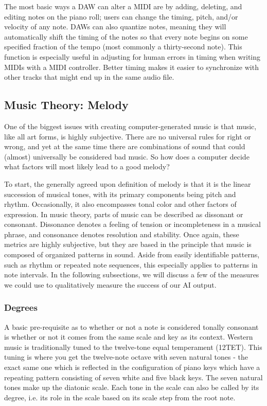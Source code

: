 The most basic ways a DAW can alter a MIDI are by adding, deleting, and editing notes on
the piano roll; users can change the timing, pitch, and/or velocity of any note. DAWs can
also quantize notes, meaning they will automatically shift the timing of the notes so that
every note begins on some specified fraction of the tempo (most commonly a thirty-second
note). This function is especially useful in adjusting for human errors in timing when
writing MIDIs with a MIDI controller. Better timing makes it easier to synchronize with
other tracks that might end up in the same audio file.

\subsection{Music Theory: Melody}

One of the biggest issues with creating computer-generated music is that music, like all art
forms, is highly subjective. There are no universal rules for right or wrong, and yet at the
same time there are combinations of sound that could (almost) universally be considered bad music.
So how does a computer decide what factors will most likely lead to a good melody?

To start, the generally agreed upon definition of melody is that it is the linear succession
of musical tones, with its primary components being pitch and rhythm. Occasionally, it also
encompasses tonal color and other factors of expression.\autocite{melody} In music theory, parts
of music can be described as dissonant or consonant. Dissonance denotes a feeling of tension or
incompleteness in a musical phrase, and consonance denotes resolution and stability. Once again,
these metrics are highly subjective, but they are based in the principle that music is composed
of organized patterns in sound.\autocite{musiciansArithmetic} Aside from easily identifiable
patterns, such as rhythm or repeated note sequences, this especially applies to patterns in note
intervals. In the following subsections, we will discuss a few of the measures we could use to
qualitatively measure the success of our AI output.

\subsubsection{Degrees}

A basic pre-requisite as to whether or not a note is considered tonally consonant is whether or
not it comes from the same scale and key as its context. Western music is traditionally tuned to
the twelve-tone equal temperament (12TET). This tuning is where you get the twelve-note octave
with seven natural tones - the exact same one which is reflected in the configuration of piano keys
which have a repeating pattern consisting of seven white and five black keys. The seven natural
tones make up the diatonic scale. Each tone in the scale can also be called by its degree, i.e.
its role in the scale based on its scale step from the root note.

